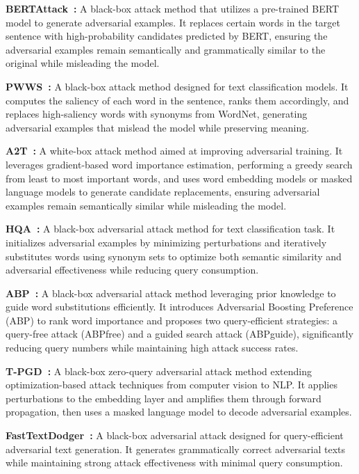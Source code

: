 \noindent
\textbf{BERTAttack~\cite{li2020bert}:} 
A black-box attack method that utilizes a pre-trained BERT model to generate adversarial examples. It replaces certain words in the target sentence with high-probability candidates predicted by BERT, ensuring the adversarial examples remain semantically and grammatically similar to the original while misleading the model. 

\noindent
\textbf{PWWS~\cite{ren2019generating}:} 
A black-box attack method designed for text classification models. It computes the saliency of each word in the sentence, ranks them accordingly, and replaces high-saliency words with synonyms from WordNet, generating adversarial examples that mislead the model while preserving meaning. 

\noindent
\textbf{A2T~\cite{yoo2021towards}:} 
A white-box attack method aimed at improving adversarial training. It leverages gradient-based word importance estimation, performing a greedy search from least to most important words, and uses word embedding models or masked language models to generate candidate replacements, ensuring adversarial examples remain semantically similar while misleading the model. 

\noindent
\textbf{HQA~\cite{liu2024hqa}:} 
A black-box adversarial attack method for text classification task. It initializes adversarial examples by minimizing perturbations and iteratively substitutes words using synonym sets to optimize both semantic similarity and adversarial effectiveness while reducing query consumption. 

\noindent
\textbf{ABP~\cite{yu2024query}:} 
A black-box adversarial attack method leveraging prior knowledge to guide word substitutions efficiently. It introduces Adversarial Boosting Preference (ABP) to rank word importance and proposes two query-efficient strategies: a query-free attack (ABPfree) and a guided search attack (ABPguide), significantly reducing query numbers while maintaining high attack success rates. 

\noindent
\textbf{T-PGD~\cite{yuan2023bridge}:} A black-box  zero-query adversarial attack method extending optimization-based attack techniques from computer vision to NLP. It applies perturbations to the embedding layer and amplifies them through forward propagation, then uses a masked language model to decode adversarial examples. 

\noindent
\textbf{FastTextDodger~\cite{hu2024fasttextdodger}:} A black-box adversarial attack designed for query-efficient adversarial text generation. It generates grammatically correct adversarial texts while maintaining strong attack effectiveness with minimal query consumption. 

